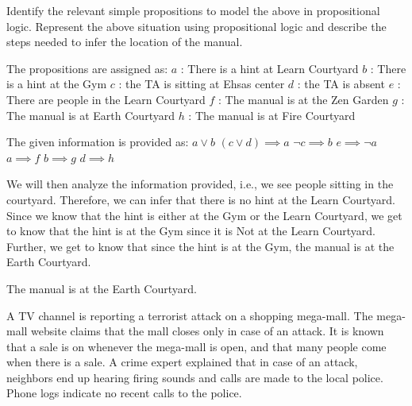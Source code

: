 \documentclass[addpoints]{exam}
\begin{document}
\begin{questions}
  Identify the relevant simple propositions to model the above in propositional logic. Represent the above situation using propositional logic and describe the steps needed to infer the location of the manual.
  \begin{solution}
    The propositions are assigned as:
    \newline$a$ : There is a hint at Learn Courtyard
    \newline$b$ : There is a hint at the Gym
    \newline$c$ : the TA is sitting at Ehsas center
    \newline$d$ : the TA is absent
    \newline$e$ : There are people in the Learn Courtyard
    \newline$f$ : The manual is at the Zen Garden
    \newline$g$ : The manual is at Earth Courtyard
    \newline$h$ : The manual is at Fire Courtyard

    The given information is provided as:
    \newline $a \lor b$
    \newline $(c \lor d) \implies a$
    \newline $\neg c \implies b$
    \newline $e \implies \neg a$
    \newline $a \implies f$
    \newline $b \implies g$
    \newline $d \implies h$

    We will then analyze the information provided, i.e., we see people sitting in the courtyard.
    Therefore, we can infer that there is no hint at the Learn Courtyard. Since we know that the hint 
    is either at the Gym or the Learn Courtyard, we get to know that the hint is at the Gym since it is Not
    at the Learn Courtyard. Further, we get to know that since the hint is at the Gym, the manual is at the Earth Courtyard.

    The manual is at the Earth Courtyard.
  \end{solution}

\question[5] A TV channel is reporting a terrorist attack on a shopping mega-mall. The mega-mall website claims that the mall closes only in case of an attack. It is known that a sale is on whenever the mega-mall is open, and that many people come when there is a sale. A crime expert explained that in case of an attack, neighbors end up hearing firing sounds and calls are made to the local police. Phone logs indicate no recent calls to the police.
  \begin{parts}

\end{parts}
\end{questions}
\end{document}
